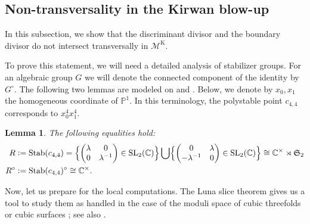 \documentclass[12pt, pdftex]{amsart}
\theoremstyle{plain}
\newtheorem{lem}[thm]{Lemma}
\theoremstyle{definition}
\numberwithin{equation}{section}
\def\C{{\mathbb C}}
\def\P{{\mathbb P}}
\def\SS{{\mathfrak S}}
\def\SL{\mathop{\mathrm{SL}}\nolimits}
\def\Stab{\mathop{\mathrm{Stab}}\nolimits}
\def\K{\mathrm{K}}
\def\M{\mathcal{M}}
\newcommand{\defeq}{\vcentcolon=}
\begin{document}
\subsection{Non-transversality in the Kirwan blow-up}
\label{non-transversality}
In this subsection, we show that the discriminant divisor and the boundary divisor do not intersect transversally in $\M^{\K}$.

To prove this statement, we will need a detailed analysis of stabilizer groups. For an algebraic group $G$ we will denote the connected component of the identity by $G^{\circ}$. 
The following two lemmas are modeled on \cite[Lemma 2.3]{CMGHL22} and \cite[Lemma 2.4]{CMGHL22}.
Below, we denote by $x_0, x_1$ the homogeneous coordinate of $\P^1$.
In this terminology, the polystable point $c_{4,4}$ corresponds to $x_0^4x_1^4$.
\begin{lem}
\label{lem:stabilizers}
The following equalities hold:
\begin{align*} 
    R&\defeq\Stab(c_{4,4})=\Bigl\{\begin{pmatrix}
\lambda & 0 \\
0 & \lambda^{-1} \\
\end{pmatrix}\in\SL_2(\C)\Bigr\}\bigcup \Bigl\{\begin{pmatrix}
0 & \lambda \\
-\lambda^{-1} & 0 \\
\end{pmatrix}\in\SL_2(\C)\Bigr\}\cong \C^{\times}\rtimes\SS_2\\
    R^{\circ}&\defeq\Stab(c_{4,4})^{\circ}\cong\C^{\times}.
    \end{align*}    
\end{lem}



Now, let us prepare for the local computations.
The Luna slice theorem gives us a tool to study them as handled in the case of the moduli space of cubic threefolds \cite[Subsection 4.3.1]{CMGHL19} or cubic surfaces \cite[Lemma 3.4]{CMGHL22}; see also \cite[Subsection 7.1]{Zh05}.
\end{document}
